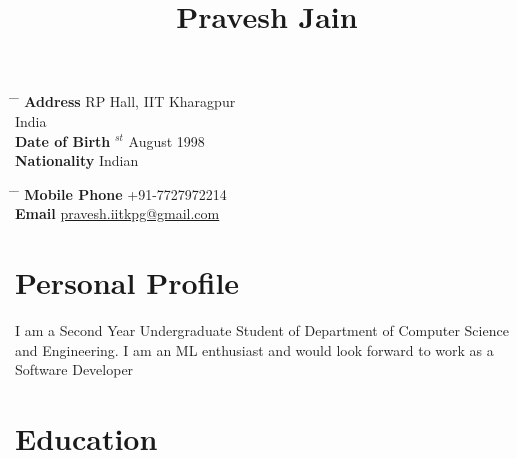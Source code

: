 \documentclass[10pt]{article} %
\begin{document}

\title{Pravesh Jain} %


\parbox{0.5\textwidth}{ %
\begin{tabbing} %
\hspace{3cm} \= \hspace{4cm} \= \kill %
{\bf Address} \>RP Hall, IIT Kharagpur\\ %
\> India \\ %
{\bf Date of Birth} $^{st}$ August 1998 \\ %
{\bf Nationality} \> Indian %
\end{tabbing}}
\hfill %
\parbox{0.5\textwidth}{ %
\begin{tabbing} %
\hspace{3cm} \= \hspace{4cm} \= \kill %
{\bf Mobile Phone} \> +91-7727972214 \\ %
{\bf Email} \> \href{mailto:john@smith.com}{pravesh.iitkpg@gmail.com}\ %
\end{tabbing}}


\section{Personal Profile}

I am a Second Year Undergraduate Student of Department of Computer Science and Engineering. I am an ML enthusiast and would look forward to work as a Software Developer


\section{Education}
\end{document}
